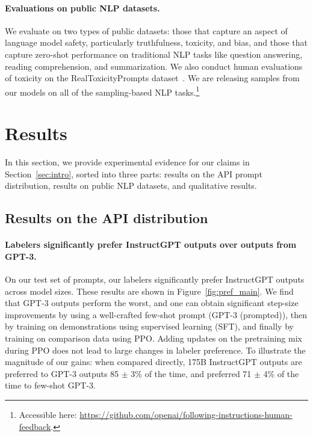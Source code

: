 \paragraph{Evaluations on public NLP datasets.} We evaluate on two types of public datasets: those that capture an aspect of language model safety, particularly truthfulness, toxicity, and bias, and those that capture zero-shot performance on traditional NLP tasks like question answering, reading comprehension, and summarization. We also conduct human evaluations of toxicity on the RealToxicityPrompts dataset~\citep{gehman2020realtoxicityprompts}. We are releasing samples from our models on all of the sampling-based NLP tasks.\footnote{Accessible here: \url{https://github.com/openai/following-instructions-human-feedback}.}

\section{Results}
\label{sec:results}

In this section, we provide experimental evidence for our claims in Section~\ref{sec:intro}, sorted into three parts: results on the API prompt distribution, results on public NLP datasets, and qualitative results.

\subsection{Results on the API distribution}
\label{sec:results-api}

\paragraph{Labelers significantly prefer InstructGPT outputs over outputs from GPT-3.} On our test set of prompts, our labelers significantly prefer InstructGPT outputs across model sizes. These results are shown in Figure~\ref{fig:pref_main}. We find that GPT-3 outputs perform the worst, and one can obtain significant step-size improvements by using a well-crafted few-shot prompt (GPT-3 (prompted)), then by training on demonstrations using supervised learning (SFT), and finally by training on comparison data using PPO. Adding updates on the pretraining mix during PPO does not lead to large changes in labeler preference. To illustrate the magnitude of our gains: when compared directly, 175B InstructGPT outputs are preferred to GPT-3 outputs 85 $\pm$ 3\% of the time, and preferred 71 $\pm$ 4\% of the time to few-shot GPT-3.

